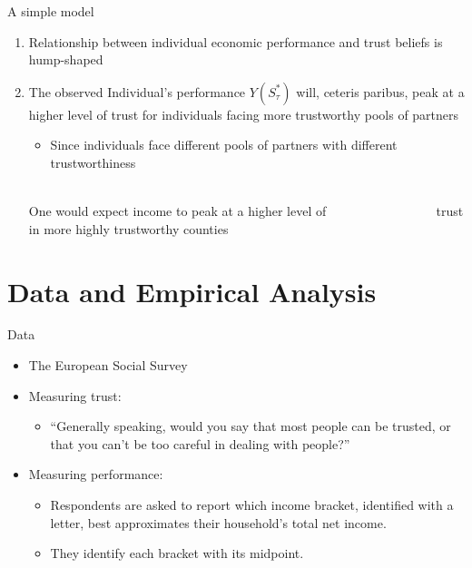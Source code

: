 \documentclass[pdftex,12pt,xcolor=pdftex,table]{beamer}
\begin{document}
\begin{frame}{A simple model}
\begin{description}
	\large	 \item[Empirical Implications] 
\end{description} 
    \begin{enumerate}
        \item Relationship between individual economic performance and trust beliefs is hump-shaped
        \item The observed Individual's performance $Y(S_\tau^*)$ will, ceteris paribus, peak at a higher level of trust for individuals facing more trustworthy pools of partners
            \begin{itemize}
                \item Since individuals face different pools of partners with different trustworthiness
            \end{itemize} \pause
     $\quad${\huge {} } \\ One would expect income to peak at a higher level of $\qquad \qquad \qquad \qquad$ trust in more highly trustworthy counties
    \end{enumerate}
\end{frame}

\section{Data and Empirical Analysis}
\begin{frame}{Data}
    \begin{itemize}
        \item The European Social Survey
        \item Measuring trust:
        \begin{itemize}
            \item “Generally speaking, would you say that most people can be trusted, or that you
can’t be too careful in dealing with people?”
        \end{itemize}
        \item Measuring performance:
        \begin{itemize}
            \item Respondents are asked
to report which income bracket, identified with a letter, best approximates their
household’s total net income.
           \item They identify each bracket with its midpoint.
        \end{itemize}
    \end{itemize}
\end{frame}
\end{document}

